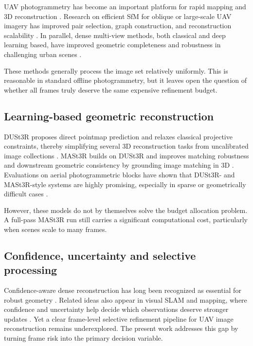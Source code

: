 \documentclass[preprint,12pt]{elsarticle}
\begin{document}
UAV photogrammetry has become an important platform for rapid mapping and 3D reconstruction \citep{Colomina2014Unmanned}. Research on efficient SfM for oblique or large-scale UAV imagery has improved pair selection, graph construction, and reconstruction scalability \citep{Jiang2017Efficient,Jiang2020Efficient,Jiang2022Leveraging,Jiang2022Parallel,Jiang2024Efficient}. In parallel, dense multi-view methods, both classical and deep learning based, have improved geometric completeness and robustness in challenging urban scenes \citep{Liu2023Deep,Liao2024High}.

These methods generally process the image set relatively uniformly. This is reasonable in standard offline photogrammetry, but it leaves open the question of whether all frames truly deserve the same expensive refinement budget.

\subsection{Learning-based geometric reconstruction}

DUSt3R proposes direct pointmap prediction and relaxes classical projective constraints, thereby simplifying several 3D reconstruction tasks from uncalibrated image collections \citep{Wang2024DUSt3R}. MASt3R builds on DUSt3R and improves matching robustness and downstream geometric consistency by grounding image matching in 3D \citep{Leroy2024MASt3R}. Evaluations on aerial photogrammetric blocks have shown that DUSt3R- and MASt3R-style systems are highly promising, especially in sparse or geometrically difficult cases \citep{Wu2025AerialBlocks}.

However, these models do not by themselves solve the budget allocation problem. A full-pass MASt3R run still carries a significant computational cost, particularly when scenes scale to many frames.

\subsection{Confidence, uncertainty and selective processing}

Confidence-aware dense reconstruction has long been recognized as essential for robust geometry \citep{Li2020Confidence}. Related ideas also appear in visual SLAM and mapping, where confidence and uncertainty help decide which observations deserve stronger updates \citep{Campos2021ORB,Qin2018VINS,Wang2024Benchmarking}. Yet a clear frame-level selective refinement pipeline for UAV image reconstruction remains underexplored. The present work addresses this gap by turning frame risk into the primary decision variable.
\end{document}

